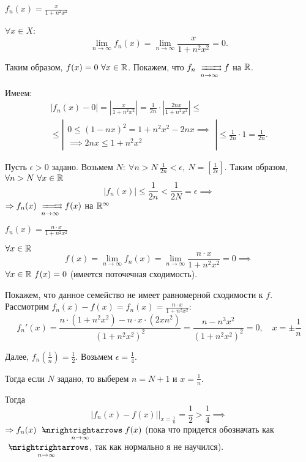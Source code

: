 \begin{example}
    $f_n(x) = \frac{x}{1 + n^2x^2}$

    $\forall x \in X$:
    \[
        \underset{n\rightarrow\infty}{\lim}f_n(x) = \underset{n\rightarrow\infty}{\lim}\frac{x}{1 + n^2x^2} = 0.
    \]

    Таким образом, $f(x) = 0 \ \forall x \in \mathbb{R}$. Покажем, что $f_n \xrightrightarrows[n\rightarrow\infty]{} f$ на $\mathbb{R}$.

    Имеем:
    \begin{multline*}
        \big|f_n(x) - 0\big| = \left|\frac{x}{1 + n^2x^2}\right| = \frac{1}{2n} \cdot \left|\frac{2nx}{1 + n^2x^2}\right| \leqslant \\
        \leqslant\left|\begin{array}{c}
            0 \leqslant (1 - nx)^2 = 1 + n^2x^2 - 2nx \implies \\
            \implies 2nx \leqslant 1 + n^2x^2
        \end{array}\right| \leqslant \frac{1}{2n}\cdot 1 = \frac{1}{2n}.
    \end{multline*}

    Пусть $\epsilon > 0$ задано. Возьмем $N: \ \forall n > N \ \frac{1}{2n} < \epsilon, \ N = \left[\frac{1}{2\epsilon}\right]$. Таким образом, $\forall n > N \ \forall x \in \mathbb{R}$
    \[
        \big|f_n(x)\big| \leqslant\frac{1}{2n} < \frac{1}{2N} = \epsilon \implies
    \]
    $\implies f_n(x) \xrightrightarrows[n\rightarrow\infty]{} f(x)$ на $\mathbb{R}^\infty$
\end{example}

\begin{example}
    $f_n(x) = \frac{n\cdot x}{1 + n^2 x^2}$

    $\forall x \in \mathbb{R}$
    \[
        f(x) = \underset{n\rightarrow\infty}{\lim}f_n(x) = \underset{n\rightarrow\infty}{\lim}\frac{n\cdot x}{1 + n^2 x^2} = 0 \implies
    \] $ \forall x \in \mathbb{R} \ f(x) = 0 $ (имеется поточечная сходимость).

    Покажем, что данное семейство не имеет равномерной сходимости к $f$. Рассмотрим $f_n(x) - f(x) = f_n(x) = \frac{n\cdot x}{1 + n^2 x^2}$:
    \[
        f_n'(x) = \frac{n\cdot (1 + n^2 x^2) - n \cdot x \cdot (2xn^2)}{(1 + n^2 x^2)^2} = \frac{n - n^3x^2}{(1 + n^2x^2)^2} = 0, \quad x = \pm\frac{1}{n}
    \]

    Далее, $f_n\left(\frac{1}{n}\right) = \frac{1}{2}$. Возьмем $\epsilon = \frac{1}{4}$.

    Тогда если $N$ задано, то выберем $n = N + 1$ и $x = \frac{1}{n}$.

    Тогда
    \[
        \big|f_n(x) - f(x)\big| \Big|_{x = \frac{1}{n}} = \frac{1}{2} > \frac{1}{4} \implies
    \]$\implies f_n(x) \xnrightrightarrows[n\rightarrow\infty]{}f(x)$ (пока что придется обозначать как $ \xnrightrightarrows[n\rightarrow\infty]{} $, так как нормально я не научился).
\end{example}

